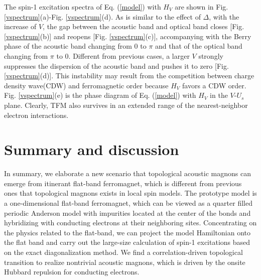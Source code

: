 \documentclass[amsmath,superscriptaddress,showpacs,aps,prb,twocolumn]{revtex4-1}
\begin{document}
\par The spin-1 excitation spectra of Eq. (\ref{model}) with $H_V$ are shown in Fig. \ref{vspectrum}(a)-Fig. \ref{vspectrum}(d). As is similar to the effect of $\Delta$, with the increase of $V$, the gap between the acoustic band and optical band closes [Fig. \ref{vspectrum}(b)] and reopens [Fig. \ref{vspectrum}(c)], accompanying with the Berry phase of the acoustic band changing from $0$ to $\pi$ and that of the optical band changing from $\pi$ to $0$. Different from previous cases, a larger $V$ strongly suppresses the dispersion of the acoustic band and pushes it to zero [Fig. \ref{vspectrum}(d)]. This instability may result from the competition between charge density wave(CDW) and ferromagnetic order because $H_V$ favors a CDW order. Fig. \ref{vspectrum}(e) is the phase diagram of Eq. (\ref{model}) with $H_V$ in the $V$-$U_s$ plane. Clearly, TFM also survives in an extended range of the nearest-neighbor electron interactions.

\section{Summary and discussion}\label{sd}
\par In summary, we elaborate a new scenario that topological acoustic magnons can emerge from itinerant flat-band ferromagnet, which is different from previous ones that topological magnons exists in local spin models. The prototype model is a one-dimensional flat-band ferromagnet, which can be viewed as a quarter filled periodic Anderson model with impurities located at the center of the bonds and hybridizing with conducting electrons at their neighboring sites. Concentrating on the physics related to the flat-band, we can project the model Hamiltonian onto the flat band and carry out the large-size calculation of spin-1 excitations based on the exact diagonalization method. We find a correlation-driven topological transition to realize nontrivial acoustic magnons, which is driven by the onsite Hubbard repulsion for conducting electrons.
\end{document}
